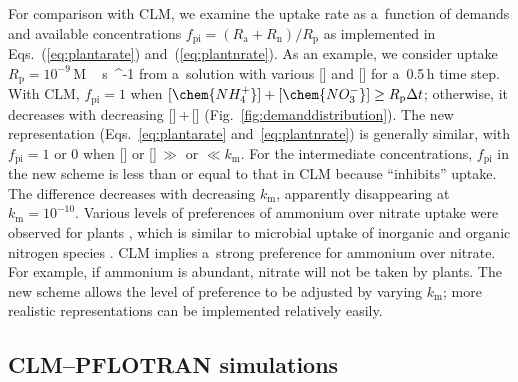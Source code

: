 \documentclass[gmd,noline]{copernicus}
\begin{document}
      For comparison with CLM, we examine the uptake rate as a~function of
      demands and available concentrations $f_{\text{pi}} = ({R_\mathrm{a} +
      R_\mathrm{n}})/{R_\mathrm{p}}$ as implemented in
      Eqs.~(\ref{eq:plantarate}) and~(\ref{eq:plantnrate}).  As an example,
      we consider uptake $R_\mathrm{p}=10^{-9}$\,\unit{M\,s{^{-1}}} from
      a~solution with various [] and [] for
      a~0.5\,h time step. With CLM, $f_{\text{pi}}=1$ when
      $[\chem{NH_4^+}]+[\chem{NO_3^-}]\geq R_\mathrm{p}\Delta t$; otherwise,
      it decreases with decreasing []\,$+$\,[]
      (Fig.~\ref{fig:demanddistribution}). The new representation
      (Eqs.~\ref{eq:plantarate} and~\ref{eq:plantnrate}) is generally
      similar, with $f_{\text{pi}}=1$ or 0 when [] or
      []\,$\gg$ or $\ll k_\mathrm{m}$. For the intermediate
      concentrations, $f_{\text{pi}}$ in the new scheme is less than or
      equal to that in CLM because  ``inhibits'' 
      uptake. The difference decreases with decreasing $k_\mathrm{m}$,
      apparently disappearing at $k_\mathrm{m} = 10^{-10}$. Various levels
      of preferences of ammonium over nitrate uptake were observed for
      plants
      \citep{Pfautsch2009,Warren2007,Nordin2001,Falkengren1995,Gherardi2013},
      which is similar to microbial uptake of inorganic and organic nitrogen
      species
      \citep{Fouilland2007,Kirchman1994,Kirchman1998,Middelburg2000,Veuger2004}. CLM
      implies a~strong preference for ammonium over nitrate. For example, if
      ammonium is abundant, nitrate will not be taken by plants. The new
      scheme allows the level of preference to be adjusted by varying
      $k_\mathrm{m}$; more realistic representations can be implemented
      relatively easily.



\subsection{CLM--PFLOTRAN simulations}%
\end{document}
